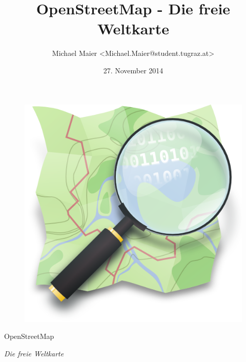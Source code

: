\documentclass{beamer}
\title{OpenStreetMap - Die freie Weltkarte}
\author{Michael Maier \textless Michael.Maier@student.tugraz.at\textgreater}
\date{27. November 2014}
\begin{document}

\begin{frame} 


\begin{figure}
  \centering
  \includegraphics[width=.5\textwidth]{mag_map.png}
\end{figure}

\begin{center}
\Huge{OpenStreetMap\\}
\end{center}

\begin{center}
\Large{\emph{Die freie Weltkarte}}
\end{center}

\end{frame}



%

%

\end{document}
